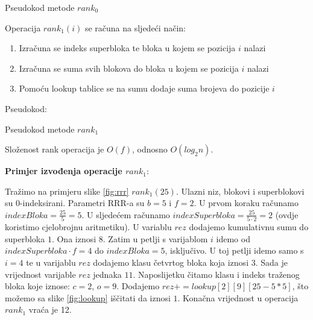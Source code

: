 \documentclass[times, utf8, seminar, numeric]{fer}
\begin{document}
\begin{algorithm}[H]
 \caption{Pseudokod metode $rank_0$}
\end{algorithm}


Operacija $rank_1(i)$ se računa na sljedeći način:
\begin{enumerate}
	\item Izračuna se indeks superbloka te bloka u kojem se pozicija $i$ nalazi
	\item Izračuna se suma svih blokova do bloka u kojem se pozicija $i$ nalazi
	\item Pomoću lookup tablice se na sumu dodaje suma brojeva do pozicije $i$
\end{enumerate}
Pseudokod:

\begin{algorithm}[H]
 \caption{Pseudokod metode $rank_1$}
\end{algorithm}

Složenost rank operacija je $O(f)$, odnosno $O(log_2n)$.

\textbf{Primjer izvođenja operacije $rank_1$}:

Tražimo na primjeru slike \ref{fig:rrr} $rank_1(25)$. Ulazni niz, blokovi i superblokovi su 0-indeksirani. Parametri RRR-a su $b=5$ i $f=2$. U prvom koraku računamo $indexBloka=\frac{25}{5}=5$.  U sljedećem računamo $indexSuperbloka=\frac{25}{5 \cdot 2}=2$ (ovdje koristimo cjelobrojnu aritmetiku). U variablu $rez$ dodajemo kumulativnu sumu do superbloka $1$. Ona iznosi $8$. Zatim u petlji s varijablom $i$ idemo od $indexSuperbloka \cdot f=4$ do $indexBloka=5$, isključivo. U toj petlji idemo samo s $i=4$ te u varijablu $rez$ dodajemo klasu četvrtog bloka koja iznosi $3$. Sada je vrijednost varijable $rez$ jednaka $11$. Naposlijetku čitamo klasu i indeks traženog bloka koje iznose: $c=2$, $o=9$. Dodajemo $rez+=lookup[2][9][25-5*5]$, što možemo sa slike \ref{fig:lookup} iščitati da iznosi $1$. Konačna vrijednost u operacija $rank_1$ vraća je 12. 
\end{document}
